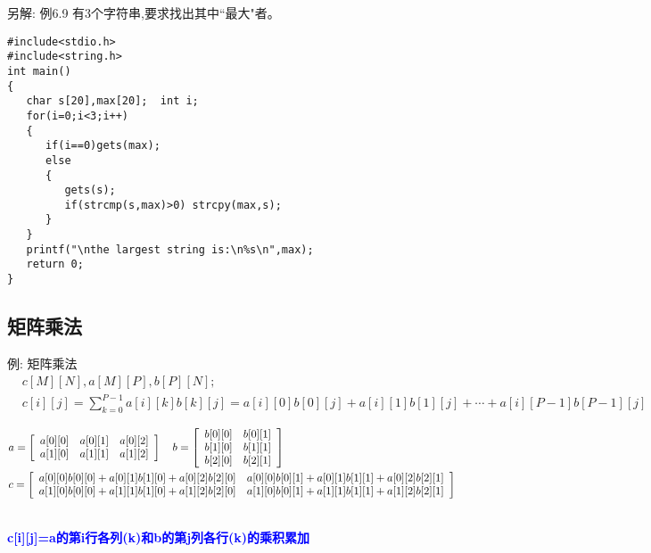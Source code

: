 \begin{frame}{\small{另解: 例6.9 有3个字符串,要求找出其中``最大"者。}}
\begin{lstlisting}
#include<stdio.h>
#include<string.h>
int main()                   
{  
   char s[20],max[20];  int i;
   for(i=0;i<3;i++)
   {
      if(i==0)gets(max);
      else
      {
         gets(s);
         if(strcmp(s,max)>0) strcpy(max,s);
      }
   }
   printf("\nthe largest string is:\n%s\n",max);
   return 0;           
}
\end{lstlisting}
\end{frame}  

\subsection{矩阵乘法}

\begin{frame}{例: 矩阵乘法}
\begin{align*}
&c[M][N],a[M][P],b[P][N];\\ &c[i][j]=\sum_{k=0}^{P-1}a[i][k]b[k][j]=a[i][0]b[0][j]+a[i][1]b[1][j]+\cdots +a[i][P-1]b[P-1][j]
\end{align*}
\begin{scriptsize}
\begin{align*}
&a=\left[\begin{array}[l]{ccc}
a[0][0] & a[0][1] & a[0][2]\\
a[1][0] & a[1][1] & a[1][2]
\end{array}
\right]\quad
b=\left[\begin{array}[l]{ccc}
b[0][0] & b[0][1] \\
b[1][0] & b[1][1] \\
b[2][0] & b[2][1]
\end{array}
\right]\\
&c=\left[\begin{array}[l]{ccc}
a[0][0]b[0][0]+a[0][1]b[1][0]+a[0][2]b[2][0] & a[0][0]b[0][1]+a[0][1]b[1][1]+a[0][2]b[2][1] \\
a[1][0]b[0][0]+a[1][1]b[1][0]+a[1][2]b[2][0] & a[1][0]b[0][1]+a[1][1]b[1][1]+a[1][2]b[2][1]
\end{array}
\right]
\end{align*}
\end{scriptsize}
\\
\pause
\bigskip
\textbf{\textcolor{blue}{c[i][j]=a的第i行各列(k)和b的第j列各行(k)的乘积累加}}
\end{frame}

